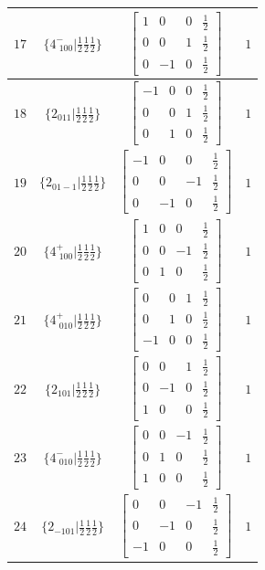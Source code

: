 \documentclass[fleqn,8pt]{jsarticle}
\begin{document}
\begin{longtable}{cccc}
$ 17 $ & $ \{4^{-}_{\,\,100}|\frac{1}{2} \frac{1}{2} \frac{1}{2}\} $ & $ \begin{bmatrix} 1 & 0 & 0 & \frac{1}{2} \\ 0 & 0 & 1 & \frac{1}{2} \\ 0 & -1 & 0 & \frac{1}{2} \end{bmatrix} $ & $ 1 $ \\ \hline
$ 18 $ & $ \{2{}_{011}|\frac{1}{2} \frac{1}{2} \frac{1}{2}\} $ & $ \begin{bmatrix} -1 & 0 & 0 & \frac{1}{2} \\ 0 & 0 & 1 & \frac{1}{2} \\ 0 & 1 & 0 & \frac{1}{2} \end{bmatrix} $ & $ 1 $ \\ \hline
$ 19 $ & $ \{2{}_{01-1}|\frac{1}{2} \frac{1}{2} \frac{1}{2}\} $ & $ \begin{bmatrix} -1 & 0 & 0 & \frac{1}{2} \\ 0 & 0 & -1 & \frac{1}{2} \\ 0 & -1 & 0 & \frac{1}{2} \end{bmatrix} $ & $ 1 $ \\ \hline
$ 20 $ & $ \{4^{+}_{\,\,100}|\frac{1}{2} \frac{1}{2} \frac{1}{2}\} $ & $ \begin{bmatrix} 1 & 0 & 0 & \frac{1}{2} \\ 0 & 0 & -1 & \frac{1}{2} \\ 0 & 1 & 0 & \frac{1}{2} \end{bmatrix} $ & $ 1 $ \\ \hline
$ 21 $ & $ \{4^{+}_{\,\,010}|\frac{1}{2} \frac{1}{2} \frac{1}{2}\} $ & $ \begin{bmatrix} 0 & 0 & 1 & \frac{1}{2} \\ 0 & 1 & 0 & \frac{1}{2} \\ -1 & 0 & 0 & \frac{1}{2} \end{bmatrix} $ & $ 1 $ \\ \hline
$ 22 $ & $ \{2{}_{101}|\frac{1}{2} \frac{1}{2} \frac{1}{2}\} $ & $ \begin{bmatrix} 0 & 0 & 1 & \frac{1}{2} \\ 0 & -1 & 0 & \frac{1}{2} \\ 1 & 0 & 0 & \frac{1}{2} \end{bmatrix} $ & $ 1 $ \\ \hline
$ 23 $ & $ \{4^{-}_{\,\,010}|\frac{1}{2} \frac{1}{2} \frac{1}{2}\} $ & $ \begin{bmatrix} 0 & 0 & -1 & \frac{1}{2} \\ 0 & 1 & 0 & \frac{1}{2} \\ 1 & 0 & 0 & \frac{1}{2} \end{bmatrix} $ & $ 1 $ \\ \hline
$ 24 $ & $ \{2{}_{-101}|\frac{1}{2} \frac{1}{2} \frac{1}{2}\} $ & $ \begin{bmatrix} 0 & 0 & -1 & \frac{1}{2} \\ 0 & -1 & 0 & \frac{1}{2} \\ -1 & 0 & 0 & \frac{1}{2} \end{bmatrix} $ & $ 1 $ \\
\end{longtable}
\end{document}
